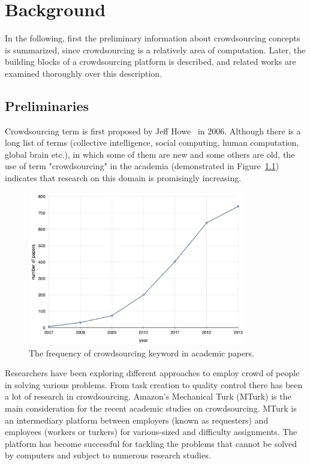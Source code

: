 \chapter{Background}
\label{chap:background}

In the following, first the preliminary information about crowdsourcing concepts 
is summarized, since crowdsourcing is a relatively area of computation. Later,
the building blocks of a crowdsourcing platform is described, and related works 
are examined thoroughly over this description.

\section{Preliminaries}
Crowdsourcing term is first proposed by Jeff Howe~\cite{Howe2006b} in 2006. 
Although there is a long list of terms (collective intelligence, social computing, 
human computation, global brain etc.), in which some of them are new and some 
others are old, the use of term "crowdsourcing" in the academia (demonstrated in 
Figure~\ref{fig:keywordstats}) indicates that research on this domain is promisingly 
increasing.

\begin{figure}[ht]
	\centering
	\includegraphics[width=0.85\textwidth]{figures/keyword_statistics.png}
	\caption[The frequency of crowdsourcing keyword in academic papers.]{The frequency of crowdsourcing keyword in academic papers.\footnotemark}
	\label{fig:keywordstats}
\end{figure}

Researchers have been exploring different approaches to employ crowd of people 
in solving various problems. From task creation to quality control there has been a 
lot of research in crowdsourcing.  Amazon's Mechanical Turk (MTurk) is the main 
consideration for the recent academic studies on crowdsourcing. MTurk is an 
intermediary platform between employers (known as requesters) 
and employees (workers or turkers) for various-sized and difficulty assignments. 
The platform has become successful for tackling the problems that cannot be 
solved by computers and subject to numerous research studies.

